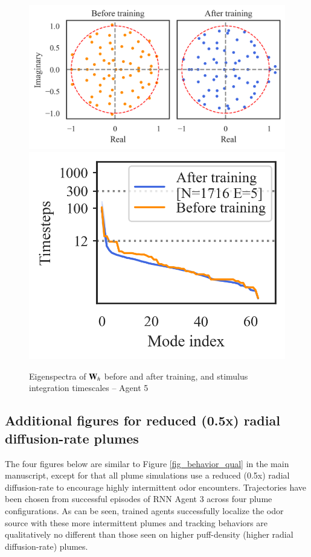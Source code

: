 \documentclass[5p,twocolumn,authoryear]{elsarticle}
\begin{document}
\begin{figure}[h!]
\centering
\includegraphics[width=0.45\linewidth]{eigenspectra_9781ba.png}
\includegraphics[width=0.27\linewidth]{timescales_9781ba.png}
\caption{Eigenspectra of $\mathbf{W}_h$ before and after training, and stimulus integration timescales -- Agent 5}
\end{figure}



\clearpage
\subsection{Additional figures for reduced (0.5x) radial diffusion-rate plumes}
\label{sec_supp_rediff}

\noindent The four figures below are similar to Figure \ref{fig_behavior_qual} in the main manuscript, except for that all plume simulations use a reduced (0.5x) radial diffusion-rate to encourage highly intermittent odor encounters.
Trajectories have been chosen from successful episodes of RNN Agent 3 across four plume configurations.
As can be seen, trained agents successfully localize the odor source with these more intermittent plumes and tracking behaviors are qualitatively no different than those seen on higher puff-density (higher radial diffusion-rate) plumes. 
\end{document}
